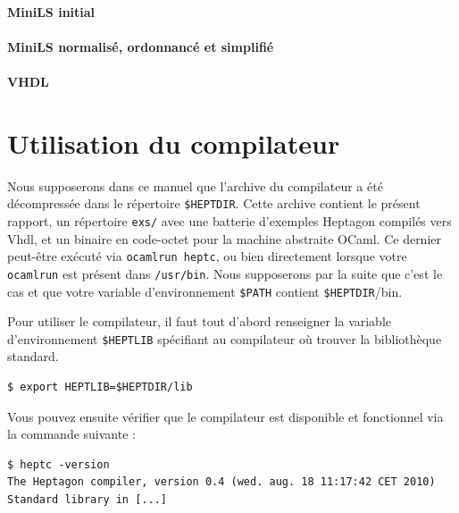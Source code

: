 \documentclass[a4paper]{article}
\newcommand{\LANG}{{\sc Heptagon}}
\newcommand{\vhdl}{{\sc Vhdl}}
\begin{document}
\paragraph{MiniLS initial}

\small

\normalsize

\paragraph{MiniLS normalisé, ordonnancé et simplifié}

\small

\normalsize

\paragraph{VHDL}

\small

\normalsize

\section{Utilisation du compilateur}

Nous supposerons dans ce manuel que l'archive du compilateur a été
décompressée dans le répertoire \verb/$HEPTDIR/. Cette archive contient le
présent rapport, un répertoire \texttt{exs/} avec une batterie d'exemples
\LANG{} compilés vers \vhdl{}, et un binaire en code-octet pour la machine
abstraite OCaml. Ce dernier peut-être exécuté via \texttt{ocamlrun heptc},
ou bien directement lorsque votre \texttt{ocamlrun} est présent dans
\texttt{/usr/bin}. Nous supposerons par la suite que c'est le cas et que votre
variable d'environnement \verb/$PATH/ contient \verb/$HEPTDIR//bin.

Pour utiliser le compilateur, il faut tout d'abord renseigner la variable
d'environnement \verb/$HEPTLIB/ spécifiant au compilateur où trouver la
bibliothèque standard.

\begin{verbatim}
$ export HEPTLIB=$HEPTDIR/lib
\end{verbatim}

Vous pouvez ensuite vérifier que le compilateur est disponible et fonctionnel
via la commande suivante :

\begin{verbatim}
$ heptc -version
The Heptagon compiler, version 0.4 (wed. aug. 18 11:17:42 CET 2010)
Standard library in [...]
\end{verbatim}
\end{document}
